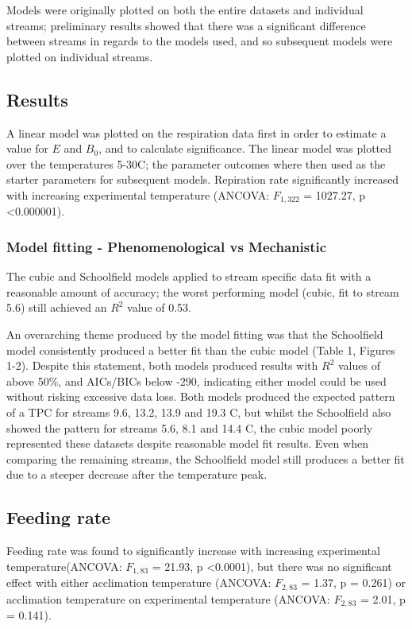 \documentclass[../../Paper.tex]{subfiles}
\begin{document}
Models were originally plotted on both the entire datasets and individual streams; 
preliminary results showed that there was a significant difference between 
streams in regards to the models used, and so subsequent models were plotted
on individual streams. 

\subsection*{Results}
A linear model was plotted on the respiration data first in order to estimate a value for $E$ and $B_0$, and to calculate significance. 
The linear model was plotted over the temperatures 5-30\degree C; the parameter 
outcomes where then used as the starter parameters for subsequent models. Repiration rate significantly increased with
increasing experimental temperature (ANCOVA: $F_{1,322}$ = 1027.27, p \textless  0.000001).

\subsubsection*{Model fitting - Phenomenological vs Mechanistic}



The cubic and Schoolfield models applied to stream specific data fit with a
reasonable amount of accuracy; the worst performing model (cubic, fit to stream 5.6) 
still achieved an $R^2$ value of 0.53. 

An overarching theme produced by the model
fitting was that the Schoolfield model consistently produced a better fit than
the cubic model (Table 1, Figures 1-2). Despite  this statement, both models produced results
with $R^2$ values of above 50\%, and AICs/BICs below -290, indicating either model could be
used without risking excessive data loss. Both models produced the expected pattern of a TPC
for streams 9.6, 13.2, 13.9 and 19.3 \degree C, but whilst the Schoolfield also showed the pattern
for streams 5.6, 8.1 and 14.4 \degree C, the cubic model poorly represented these
datasets despite reasonable model fit results. Even when comparing the remaining
streams, the Schoolfield model still produces a better fit due to a steeper decrease after
the temperature peak. 


\subsection*{Feeding rate}

Feeding rate was found to significantly increase with increasing
experimental temperature(ANCOVA: $F_{1,83}$ = 21.93, p \textless  0.0001), but
there was no significant effect with either acclimation temperature 
(ANCOVA: $F_{2,83}$ = 1.37, p = 0.261) or acclimation temperature on 
experimental temperature (ANCOVA: $F_{2,83}$ = 2.01, p = 0.141). 
\end{document}
